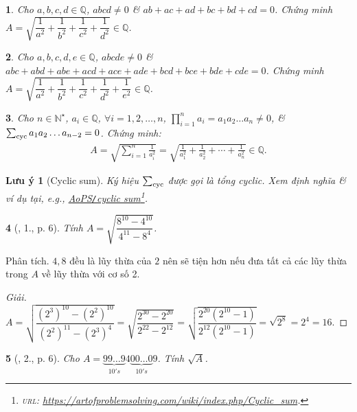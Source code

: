 \documentclass{article}
\newtheorem{baitoan}{}%
\newtheorem{luuy}{Lưu ý}
\begin{document}
\begin{baitoan}
	Cho $a,b,c,d\in\mathbb{Q}$, $abcd\ne0$ \& $ab + ac + ad + bc + bd + cd = 0$. Chứng minh $A = \sqrt{\dfrac{1}{a^2} + \dfrac{1}{b^2} + \dfrac{1}{c^2} + \dfrac{1}{d^2}}\in\mathbb{Q}$.
\end{baitoan}

\begin{baitoan}
	Cho $a,b,c,d,e\in\mathbb{Q}$, $abcde\ne0$ \& $abc + abd + abe + acd + ace + ade + bcd + bce + bde + cde = 0$. Chứng minh $A = \sqrt{\dfrac{1}{a^2} + \dfrac{1}{b^2} + \dfrac{1}{c^2} + \dfrac{1}{d^2} + \dfrac{1}{e^2}}\in\mathbb{Q}$.
\end{baitoan}

\begin{baitoan}
	Cho $n\in\mathbb{N}^\star$, $a_i\in\mathbb{Q}$, $\forall i = 1,2,\ldots,n$, $\prod_{i=1}^n a_i = a_1a_2\ldots a_n\ne0$, \& $\sum_{\rm cyc} a_1a_2\ldots a_{n-2} = 0$. Chứng minh:
	\begin{align*}
		A = \sqrt{\sum_{i=1}^n \frac{1}{a_i^2}} = \sqrt{\frac{1}{a_1^2} + \frac{1}{a_2^2} + \cdots + \frac{1}{a_n^2}}\in\mathbb{Q}.
	\end{align*}
\end{baitoan}

\begin{luuy}[Cyclic sum]
	Ký hiệu $\sum_{\rm cyc}$ được gọi là tổng cyclic. Xem định nghĩa \& ví dụ tại, e.g., \href{https://artofproblemsolving.com/wiki/index.php/Cyclic_sum}{AoPS\emph{\texttt{/}}cyclic sum}\footnote{\textsc{url}: \url{https://artofproblemsolving.com/wiki/index.php/Cyclic_sum}.}.
\end{luuy}

\begin{baitoan}[\cite{Tuyen_Toan_9_old}, 1., p. 6]
	Tính $A = \sqrt{\dfrac{8^{10} - 4^{10}}{4^{11} - 8^4}}$.
\end{baitoan}
\noindent\textsf{Phân tích.} $4,8$ đều là lũy thừa của $2$ nên sẽ tiện hơn nếu đưa tất cả các lũy thừa trong $A$ về lũy thừa với cơ số 2.

\begin{proof}[Giải]
	$A = \sqrt{\dfrac{(2^3)^{10} - (2^2)^{10}}{(2^2)^{11} - (2^3)^4}} = \sqrt{\dfrac{2^{30} - 2^{20}}{2^{22} - 2^{12}}} = \sqrt{\dfrac{2^{20}(2^{10} - 1)}{2^{12}(2^{10} - 1)}} = \sqrt{2^8} = 2^4 = 16$.
\end{proof}

\begin{baitoan}[\cite{Tuyen_Toan_9_old}, 2., p. 6]
	Cho $A = \underbrace{99\ldots9}_{10's}4\underbrace{00\ldots0}_{10's}9$. Tính $\sqrt{A}$.
\end{baitoan}
\end{document}
